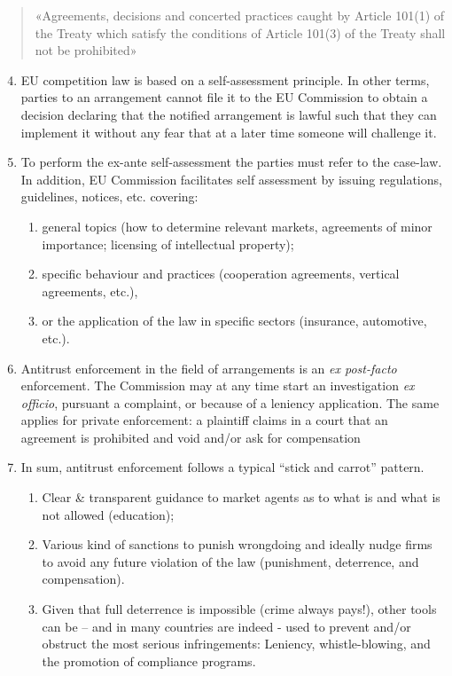     \begin{quote}
        «Agreements, decisions and concerted practices caught by Article 101(1) of the Treaty which satisfy the conditions of Article 101(3) of the Treaty shall not be prohibited»
    \end{quote}

    \begin{enumerate}
        \setcounter{enumi}{3}
        \item EU competition law is based on a self-assessment principle. In other terms, parties to an arrangement cannot file it to the EU Commission to obtain a decision declaring that the notified arrangement is lawful such that they can implement it without any fear that at a later time someone will challenge it.
        \item To perform the ex-ante self-assessment the parties must refer to the case-law. In addition, EU Commission facilitates self assessment by issuing regulations, guidelines, notices, etc. covering:
            \begin{enumerate}
                \item general topics (how to determine relevant markets, agreements of minor importance; licensing of intellectual property); 
                \item specific behaviour and practices (cooperation agreements, vertical agreements, etc.), 
                \item or the application of the law in specific sectors (insurance, automotive, etc.).
            \end{enumerate}
        \item Antitrust enforcement in the field of arrangements is an \textit{ex post-facto} enforcement. The Commission may at any time start an investigation \textit{ex officio}, pursuant a complaint, or because of a leniency application. The same applies for private enforcement: a plaintiff claims in a court that an agreement is prohibited and void and/or ask for compensation
        \item In sum, antitrust enforcement follows a typical “stick and carrot” pattern.
            \begin{enumerate}
                \item Clear \& transparent guidance to market agents as to what is and what is not allowed (education); 
                \item Various kind of sanctions to punish wrongdoing and ideally nudge firms to avoid any future violation of the law (punishment, deterrence, and compensation).
                \item Given that full deterrence is impossible (crime always pays!), other tools can be – and in many countries are indeed - used to prevent and/or obstruct the most serious infringements: Leniency, whistle-blowing, and the promotion of compliance programs.
            \end{enumerate}
    \end{enumerate}

